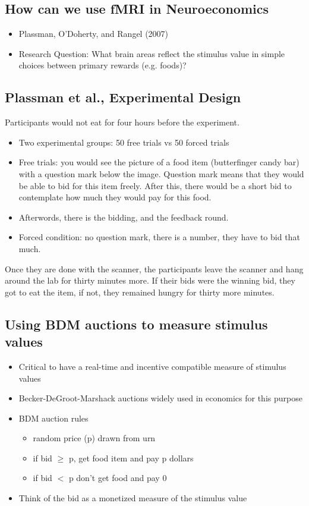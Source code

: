 \subsection{How can we use fMRI in Neuroeconomics}
\begin{itemize}
    \item Plassman, O'Doherty, and Rangel (2007)
    \item Research Question: What brain areas reflect the stimulus value in simple choices between primary rewards (e.g. foods)?
    
\end{itemize}

\subsection{Plassman et al., Experimental Design}
Participants would not eat for four hours before the experiment.
\begin{itemize}
    \item Two experimental groups: 50 free trials vs 50 forced trials
    \item Free trials: you would see the picture of a food item (butterfinger candy bar) with a question mark below the image. Question mark means that they would be able to bid for this item freely. After this, there would be a short bid to contemplate how much they would pay for this food.
    \item Afterwords, there is the bidding, and the feedback round.
    \item Forced condition: no question mark, there is a number, they have to bid that much.
\end{itemize}
Once they are done with the scanner, the participants leave the scanner and hang around the lab for thirty minutes more. If their bids were the winning bid, they got to eat the item, if not, they remained hungry for thirty more minutes. 
\subsection{Using BDM auctions to measure stimulus values}
\begin{itemize}
    \item Critical to have a real-time and incentive compatible measure of stimulus values
    \item Becker-DeGroot-Marshack auctions widely used in economics for this purpose
    \item BDM auction rules
    \begin{itemize}
        \item random price (p) drawn from urn
        \item if bid $\geq$ p, get food item and pay p dollars
        \item if bid $<$ p don't get food and pay 0
    \end{itemize}
    \item Think of the bid as a monetized measure of the stimulus value
\end{itemize}


